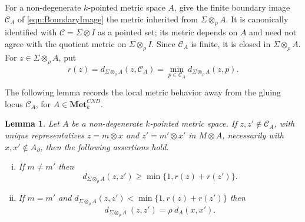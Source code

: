 \documentclass{sn-jnl}%
\theoremstyle{thmstyleone}%
\newtheorem{lemma}[theorem]{Lemma}%
\theoremstyle{thmstyletwo}%
\theoremstyle{thmstylethree}%
\newcommand{\mcnd}{\mathbf{Met}_{k}^{CND}}
\newcommand{\M}{\Sigma}
\newcommand{\F}{\M\otimes}
\newcommand{\Fw}{\M\otimes_{\w}}
\newcommand{\w}{\rho}
\begin{document}
For a non-degenerate $k$-pointed metric space $A$, give the finite boundary image $\mathcal C_A$ of \eqref{eqn:BoundaryImage} the metric inherited from $\Fw A$. It is canonically identified with $\mathcal C=\F I$ as a pointed set; its metric depends on $A$ and need not agree with the quotient metric on $\Fw I$. Since $\mathcal C_A$ is finite, it is closed in $\Fw A$. For $z\in\Fw A$, put
\begin{equation}
\nonumber
   r(z)=d_{\Fw A}(z,\mathcal C_A)=\min_{p\in \mathcal C_A}d_{\Fw A}(z,p).
\label{eqn:distance_to_gluing_locus}
\end{equation}

The following lemma records the local metric behavior away from the gluing locus $\mathcal C_A$, for $A \in \mcnd$.

\begin{lemma}
\label{lem:metric_behaviour_away_form_guling_locus}
    Let $A$ be a non-degenerate $k$-pointed metric space. If $z,z'\notin \mathcal C_A$, with unique representatives  $z=m\otimes x$ and $z'=m'\otimes x'$ in $M\otimes A$,  necessarily with $x, x'\notin A_{\partial}$,  then the following assertions hold.
    \begin{enumerate}[(i)]
        \item \label{eqn:bound_1} If $m\neq m'$ then   
        \begin{equation} 
        \nonumber
            d_{\Fw A}(z,z')\geq\min\{1,r(z)+r(z')\}.
        \end{equation}
        \item \label{eqn:bound_2} If $ m=m'$ and $d_{\Fw A}(z,z')<\min\{1,r(z)+r(z')\}$ then
        \begin{equation} 
        \nonumber
            d_{\Fw A}~(z,z')=\rho~d_A(x,x').
        \end{equation}
    \end{enumerate}
\end{lemma}
\end{document}
